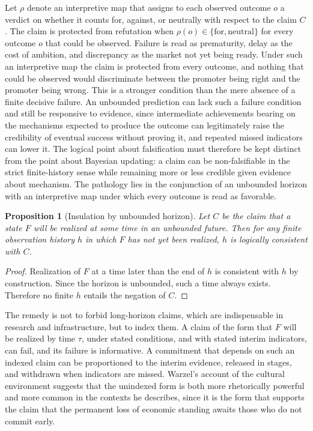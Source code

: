 \documentclass[11pt]{article}
\theoremstyle{plain}
\newtheorem{proposition}{Proposition}
\theoremstyle{definition}
\theoremstyle{remark}
\begin{document}
Let $\rho$ denote an interpretive map that assigns to each observed outcome $o$ a verdict on whether it counts for, against, or neutrally with respect to the claim $C$. The claim is protected from refutation when $\rho(o) \in \{\text{for}, \text{neutral}\}$ for every outcome $o$ that could be observed. Failure is read as prematurity, delay as the cost of ambition, and discrepancy as the market not yet being ready. Under such an interpretive map the claim is protected from every outcome, and nothing that could be observed would discriminate between the promoter being right and the promoter being wrong. This is a stronger condition than the mere absence of a finite decisive failure. An unbounded prediction can lack such a failure condition and still be responsive to evidence, since intermediate achievements bearing on the mechanisms expected to produce the outcome can legitimately raise the credibility of eventual success without proving it, and repeated missed indicators can lower it. The logical point about falsification must therefore be kept distinct from the point about Bayesian updating: a claim can be non-falsifiable in the strict finite-history sense while remaining more or less credible given evidence about mechanism. The pathology lies in the conjunction of an unbounded horizon with an interpretive map under which every outcome is read as favorable.

\begin{proposition}[Insulation by unbounded horizon]
Let $C$ be the claim that a state $F$ will be realized at some time in an unbounded future. Then for any finite observation history $h$ in which $F$ has not yet been realized, $h$ is logically consistent with $C$.
\end{proposition}

\begin{proof}
Realization of $F$ at a time later than the end of $h$ is consistent with $h$ by construction. Since the horizon is unbounded, such a time always exists. Therefore no finite $h$ entails the negation of $C$.
\end{proof}

The remedy is not to forbid long-horizon claims, which are indispensable in research and infrastructure, but to index them. A claim of the form that $F$ will be realized by time $\tau$, under stated conditions, and with stated interim indicators, can fail, and its failure is informative. A commitment that depends on such an indexed claim can be proportioned to the interim evidence, released in stages, and withdrawn when indicators are missed. Warzel's account of the cultural environment suggests that the unindexed form is both more rhetorically powerful and more common in the contexts he describes, since it is the form that supports the claim that the permanent loss of economic standing awaits those who do not commit early.
\end{document}
